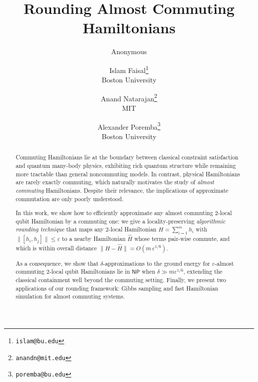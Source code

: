\documentclass[11pt]{article}
\title{Rounding Almost Commuting Hamiltonians}
\author{Anonymous}
\date{}
\author{Islam Faisal\thanks{\texttt{islam@bu.edu}}\\\small{Boston University} \and Anand Natarajan\thanks{\texttt{anandn@mit.edu}}\\\small{MIT}\and Alexander Poremba\thanks{\texttt{poremba@bu.edu}}\\\small{Boston University}}
\date{ }
\theoremstyle{plain}
\newcommand{\eps}{\varepsilon}
\begin{document}
\maketitle
\vspace{0.45cm}
\begin{abstract}
Commuting Hamiltonians lie at the boundary between classical constraint satisfaction and quantum many-body physics, exhibiting rich quantum structure while remaining more tractable than general noncommuting models.  In contrast, physical Hamiltonians are rarely exactly commuting,
which naturally motivates the study of \emph{almost commuting} Hamiltonians. Despite their relevance, the implications of approximate commutation are only poorly understood.

In this work, we show how to efficiently approximate any almost commuting $2$-local qubit Hamiltonian by a commuting one: we give a locality-preserving \emph{algorithmic rounding technique} that maps any $2$-local Hamiltonian $H=\sum_{i=1}^m h_i$ with $\|[h_i,h_j]\| \leq \eps$ to a nearby Hamiltonian
$\hat{H}$ whose terms pair-wise commute, and which is within overall distance
$\|H-\hat{H}\| = O(m\,\eps^{1/6})$.  

As a consequence, we show that $\delta$-approximations to the ground energy for
$\eps$-almost commuting $2$-local qubit Hamiltonians
lie in $\mathsf{NP}$ when $\delta \gg m\eps^{1/6}$, extending the classical containment well
beyond the commuting setting.   Finally, we present two applications of our rounding framework: Gibbs sampling and fast Hamiltonian simulation for almost commuting systems.
\end{abstract}


\end{document}
